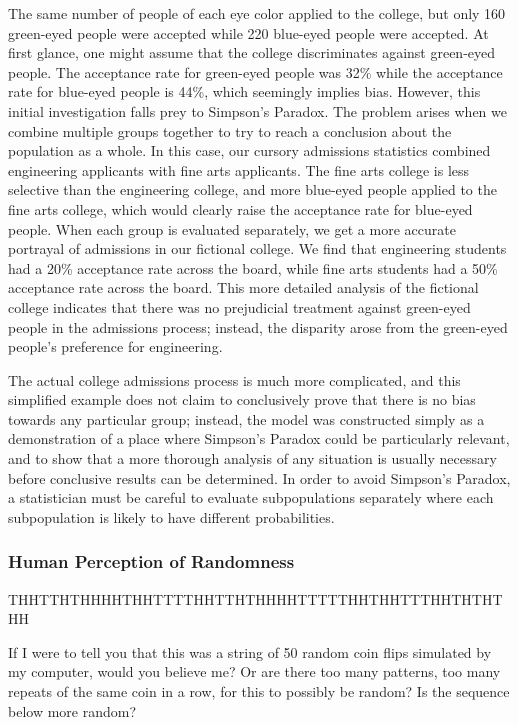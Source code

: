 The same number of people of each eye color applied to the college, but only 160 green-eyed people were accepted while 220 blue-eyed people were accepted. At first glance, one might assume that the college discriminates against green-eyed people. The acceptance rate for green-eyed people was 32\% while the acceptance rate for blue-eyed people is 44\%, which seemingly implies bias. However, this initial investigation falls prey to Simpson’s Paradox. The problem arises when we combine multiple groups together to try to reach a conclusion about the population as a whole. In this case, our cursory admissions statistics combined engineering applicants with fine arts applicants. The fine arts college is less selective than the engineering college, and more blue-eyed people applied to the fine arts college, which would clearly raise the acceptance rate for blue-eyed people. When each group is evaluated separately, we get a more accurate portrayal of admissions in our fictional college. We find that engineering students had a 20\% acceptance rate across the board, while fine arts students had a 50\% acceptance rate across the board. This more detailed analysis of the fictional college indicates that there was no prejudicial treatment against green-eyed people in the admissions process; instead, the disparity arose from the green-eyed people’s preference for engineering.

The actual college admissions process is much more complicated, and this simplified example does not claim to conclusively prove that there is no bias towards any particular group; instead, the model was constructed simply as a demonstration of a place where Simpson’s Paradox could be particularly relevant, and to show that a more thorough analysis of any situation is usually necessary before conclusive results can be determined. In order to avoid Simpson’s Paradox, a statistician must be careful to evaluate subpopulations separately where each subpopulation is likely to have different probabilities.

\subsubsection*{Human Perception of Randomness}

\begin{center}
    THHTTHTHHHHTHHTTTTHHTTHTHHHHTTTTTHHTHHTTTHHTHTHTHH
\end{center}

If I were to tell you that this was a string of 50 random coin flips simulated by my computer, would you believe me? Or are there too many patterns, too many repeats of the same coin in a row, for this to possibly be random? Is the sequence below more random?

